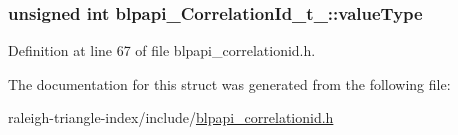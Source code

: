\subsubsection[{\texorpdfstring{value\+Type}{valueType}}]{\setlength{\rightskip}{0pt plus 5cm}unsigned int blpapi\+\_\+\+Correlation\+Id\+\_\+t\+\_\+\+::value\+Type}\hypertarget{structblpapi___correlation_id__t___ab7bce6fc7b549d65d62ba08d66a800bc}{}\label{structblpapi___correlation_id__t___ab7bce6fc7b549d65d62ba08d66a800bc}


Definition at line 67 of file blpapi\+\_\+correlationid.\+h.



The documentation for this struct was generated from the following file\+:\begin{DoxyCompactItemize}
\item 
raleigh-\/triangle-\/index/include/\hyperlink{blpapi__correlationid_8h}{blpapi\+\_\+correlationid.\+h}\end{DoxyCompactItemize}
